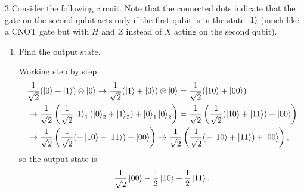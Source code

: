 \documentclass[11pt]{article}
\begin{document}
\begin{problem}{3}
  Consider the following circuit.
  Note that the connected dots indicate that the gate on the second qubit acts only if the first qubit is in the state \(\ket{1}\) (much like a CNOT gate but with \(H\) and \(Z\) instead of \(X\) acting on the second qubit).
  \begin{center}
  \end{center}
  \begin{enumerate}[label=(\alph*)]
    \item Find the output state.
          \begin{answer}
            Working step by step,
            \begin{equation}
            \label{eq:6}
            \begin{aligned}
              &\frac{1}{\sqrt{2}}(\ket{0} + \ket{1}) \otimes \ket{0} \rightarrow \frac{1}{\sqrt{2}}(\ket{1} + \ket{0}) \otimes \ket{0} = \frac{1}{\sqrt{2}}(\ket{10} + \ket{00}) \\
              &\rightarrow \frac{1}{\sqrt{2}} \left( \frac{1}{\sqrt{2}}\ket{1}_1(\ket{0}_{2} + \ket{1}_{2}) + \ket{0}_1\ket{0}_{2}\right) = \frac{1}{\sqrt{2}} \left( \frac{1}{\sqrt{2}}(\ket{10} + \ket{11}) + \ket{00} \right) \\
              &\rightarrow \frac{1}{\sqrt{2}}\left( \frac{1}{\sqrt{2}}(-\ket{10} - \ket{11}) + \ket{00} \right) \rightarrow \frac{1}{\sqrt{2}} \left( \frac{1}{\sqrt{2}}(-\ket{10} + \ket{11}) + \ket{00} \right),
            \end{aligned}
          \end{equation}
          so the output state is
          \begin{equation}
          \label{eq:7}
          \frac{1}{\sqrt{2}}\ket{00} - \frac{1}{2}\ket{10} + \frac{1}{2}\ket{11}.

\end{equation}
\end{answer}
\end{enumerate}
\end{problem}
\end{document}
